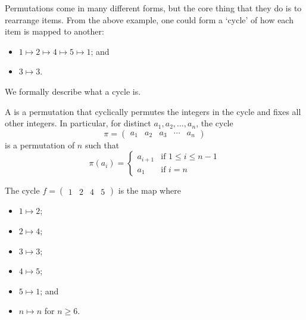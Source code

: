 Permutations come in many different forms, but the core thing that they do is to rearrange items. From the above example, one could form a `cycle' of how each item is mapped to another:
\begin{itemize}
    \item $1 \mapsto 2 \mapsto 4 \mapsto 5 \mapsto 1$; and
    \item $3 \mapsto 3$.
\end{itemize}
We formally describe what a cycle is.
\begin{definition}
    A  is a permutation that cyclically permutes the integers in the cycle and fixes all other integers. In particular, for distinct $a_1, a_2, \dots, a_n$, the cycle
    \[
        \pi = \begin{pmatrix}a_1&a_2&a_3&\cdots&a_n\end{pmatrix}
    \]
    is a permutation of  $n$ such that
    \[
        \pi(a_i) = \begin{cases}
            a_{i+1}& \text{if } 1 \leq i \leq n - 1\\
            a_1 & \text{if } i = n
        \end{cases}
    \]
\end{definition}
\begin{example}
    The cycle $f = \begin{pmatrix}1 & 2 & 4 & 5\end{pmatrix}$ is the map where
    \begin{multicols}{3}
        \begin{itemize}
            \item $1 \mapsto 2$;
            \item $2 \mapsto 4$;
            \item $3 \mapsto 3$;
            \item $4 \mapsto 5$;
            \item $5 \mapsto 1$; and
            \item $n \mapsto n$ for $n \geq 6$.
        \end{itemize}
    \end{multicols}
\end{example}

